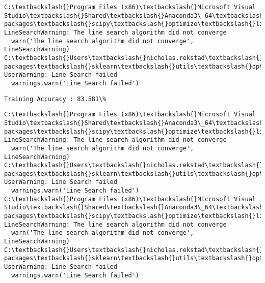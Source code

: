 \documentclass[11pt]{article}
\begin{document}
    \begin{Verbatim}[commandchars=\\\{\}]
C:\textbackslash{}Program Files (x86)\textbackslash{}Microsoft Visual Studio\textbackslash{}Shared\textbackslash{}Anaconda3\_64\textbackslash{}lib\textbackslash{}site-packages\textbackslash{}scipy\textbackslash{}optimize\textbackslash{}linesearch.py:313: LineSearchWarning: The line search algorithm did not converge
  warn('The line search algorithm did not converge', LineSearchWarning)
C:\textbackslash{}Users\textbackslash{}nicholas.rekstad\textbackslash{}AppData\textbackslash{}Roaming\textbackslash{}Python\textbackslash{}Python36\textbackslash{}site-packages\textbackslash{}sklearn\textbackslash{}utils\textbackslash{}optimize.py:195: UserWarning: Line Search failed
  warnings.warn('Line Search failed')

    \end{Verbatim}

    \begin{Verbatim}[commandchars=\\\{\}]
Training Accuracy : 83.581\%

    \end{Verbatim}

    \begin{Verbatim}[commandchars=\\\{\}]
C:\textbackslash{}Program Files (x86)\textbackslash{}Microsoft Visual Studio\textbackslash{}Shared\textbackslash{}Anaconda3\_64\textbackslash{}lib\textbackslash{}site-packages\textbackslash{}scipy\textbackslash{}optimize\textbackslash{}linesearch.py:313: LineSearchWarning: The line search algorithm did not converge
  warn('The line search algorithm did not converge', LineSearchWarning)
C:\textbackslash{}Users\textbackslash{}nicholas.rekstad\textbackslash{}AppData\textbackslash{}Roaming\textbackslash{}Python\textbackslash{}Python36\textbackslash{}site-packages\textbackslash{}sklearn\textbackslash{}utils\textbackslash{}optimize.py:195: UserWarning: Line Search failed
  warnings.warn('Line Search failed')
C:\textbackslash{}Program Files (x86)\textbackslash{}Microsoft Visual Studio\textbackslash{}Shared\textbackslash{}Anaconda3\_64\textbackslash{}lib\textbackslash{}site-packages\textbackslash{}scipy\textbackslash{}optimize\textbackslash{}linesearch.py:313: LineSearchWarning: The line search algorithm did not converge
  warn('The line search algorithm did not converge', LineSearchWarning)
C:\textbackslash{}Users\textbackslash{}nicholas.rekstad\textbackslash{}AppData\textbackslash{}Roaming\textbackslash{}Python\textbackslash{}Python36\textbackslash{}site-packages\textbackslash{}sklearn\textbackslash{}utils\textbackslash{}optimize.py:195: UserWarning: Line Search failed
  warnings.warn('Line Search failed')

    \end{Verbatim}
\end{document}

